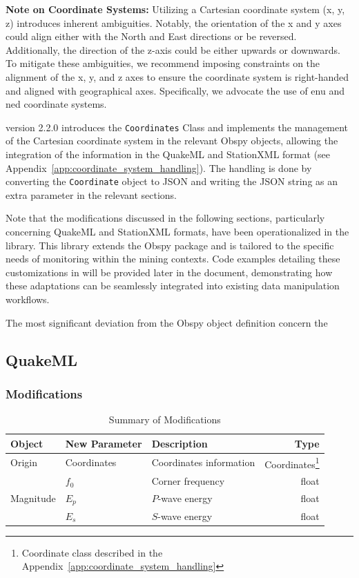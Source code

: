 \begin{mdframed}[backgroundcolor=gray!20]
\textbf{Note on Coordinate Systems:} Utilizing a Cartesian coordinate system (x, y, z) introduces inherent ambiguities. Notably, the orientation of the x and y axes could align either with the North and East directions or be reversed. Additionally, the direction of the z-axis could be either upwards or downwards. To mitigate these ambiguities, we recommend imposing constraints on the alignment of the x, y, and z axes to ensure the coordinate system is right-handed and aligned with geographical axes. Specifically, we advocate the use of \gls{enu} and \gls{ned} coordinate systems.

\muquake version 2.2.0 introduces the \texttt{Coordinates} Class and implements the management of the Cartesian coordinate system in the relevant Obspy objects, allowing the integration of the information in the QuakeML and StationXML format (see Appendix~\ref{app:coordinate_system_handling}). The handling is done by converting the \texttt{Coordinate} object to JSON and writing the JSON string as an extra parameter in the relevant sections.
\end{mdframed}

Note that the modifications discussed in the following sections, particularly concerning QuakeML and StationXML formats, have been operationalized in the \muquake library. This library extends the Obspy package and is tailored to the specific needs of \museismic monitoring within the mining contexts. Code examples detailing these customizations in \muquake will be provided later in the document, demonstrating how these adaptations can be seamlessly integrated into existing data manipulation workflows.


The most significant deviation from the Obspy object definition concern the 


\subsection{QuakeML}
\subsubsection{Modifications}

\begin{table}[!h]
\centering
\caption{Summary of Modifications}
\begin{tabular}{lllr}
\hline
\textbf{Object} & \textbf{New Parameter} & \textbf{Description} & \textbf{Type} \\
\hline
\multirow{1}{*}{Origin}     & Coordinates & Coordinates information & Coordinates\footnote{Coordinate class described in the Appendix~\ref{app:coordinate_system_handling}} \\
\hline
\multirow{3}{*}{Magnitude}  & \(f_0\) & Corner frequency & float \\
                            & \(E_p\) & \(P\)-wave energy & float \\
                            & \(E_s\) & \(S\)-wave energy & float \\
\hline
\end{tabular}
\end{table}


